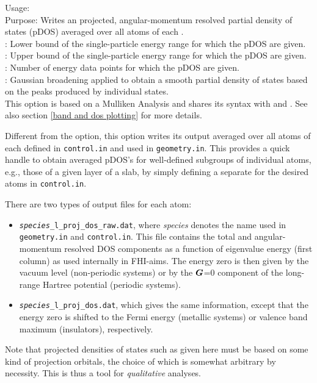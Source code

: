 {
  Usage:    \\[1.0ex]
  Purpose: Writes an projected, angular-momentum resolved partial
    density of states (pDOS) averaged over all atoms of each
    . \\[1.0ex]
   : Lower bound of the single-particle energy range
    for which the pDOS are given. \\
   : Upper bound of the single-particle energy range
    for which the pDOS are given. \\
   : Number of energy data points for which the
    pDOS are given. \\
   : Gaussian broadening applied to obtain a smooth
    partial density of states based on the peaks produced by
    individual states. \\
}
This option is based on a Mulliken Analysis and shares its syntax with
  and 
. See also section \ref{band
and dos plotting} for more details.

Different from the
 option, this option writes its
output averaged over all atoms of each  defined in
\texttt{control.in} and used in \texttt{geometry.in}. This provides a
quick handle to obtain averaged pDOS's for well-defined subgroups of
individual atoms, e.g., those of a given layer of a slab, by simply
defining a separate  for the desired atoms in
\texttt{control.in}.

There are two types of output files for each atom:
\begin{itemize}
  \item \texttt{\emph{species}\_l\_proj\_dos\_raw.dat}, where \emph{species}
    denotes the  name used in \texttt{geometry.in} and
    \texttt{control.in}. This file
    contains the total and angular-momentum resolved DOS components as a
    function of eigenvalue energy (first column) as used internally in
    FHI-aims. The energy zero is then given by the vacuum level (non-periodic
    systems) or by the $\mbox{\boldmath$G$}$=0 component of the long-range Hartree
    potential (periodic systems).
  \item \texttt{\emph{species}\_l\_proj\_dos.dat}, which gives the same
    information, except that the energy zero is shifted to the Fermi energy
    (metallic systems) or valence band maximum (insulators), respectively.
\end{itemize}
Note that projected densities of states such as given here must be
based on some kind of projection orbitals, the choice of which is
somewhat arbitrary by necessity. This is thus a tool for
\emph{qualitative} analyses.

